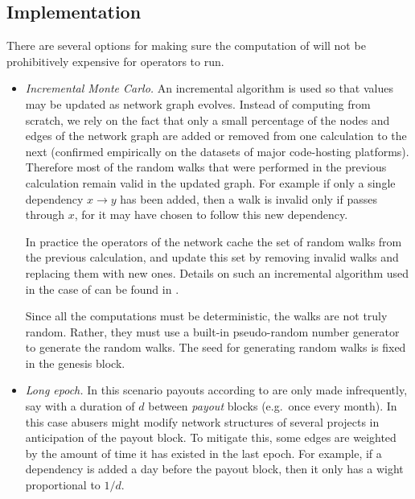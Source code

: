 

\subsection{Implementation}

There are several options for making sure the computation of \osrank{}
will not be prohibitively expensive for operators to run.

\begin{itemize}
\item \emph{Incremental Monte Carlo.} An incremental algorithm is used
  so that \osrank{} values may be updated as network graph
  evolves. Instead of computing \osrank{} from scratch, we rely on the
  fact that only a small percentage of the nodes and edges of the
  network graph are added or removed from one calculation to the next
  (confirmed empirically on the datasets of major code-hosting
  platforms). Therefore most of the random walks that were performed
  in the previous calculation remain valid in the updated graph. For
  example if only a single dependency $x \to y$ has been added, then a
  walk is invalid only if passes through $x$, for it may have chosen
  to follow this new dependency.

  In practice the operators of the network cache the set of random
  walks from the previous calculation, and update this set by removing
  invalid walks and replacing them with new ones. Details on such an
  incremental algorithm used in the case of \pagerank{} can be found
  in \cite{incr_pagerank}.

  Since all the computations must be deterministic, the walks are not
  truly random. Rather, they must use a built-in pseudo-random number
  generator to generate the random walks. The seed for generating
  random walks is fixed in the genesis block.

\item \emph{Long epoch.} In this scenario payouts according to
  \osrank{} are only made infrequently, say with a duration of $d$
  between \emph{payout} blocks (e.g.\ once every month). In this case
  abusers might modify network structures of several projects in
  anticipation of the payout block. To mitigate this, some edges are
  weighted by the amount of time it has existed in the last epoch. For
  example, if a dependency is added a day before the payout block,
  then it only has a wight proportional to $1/d$.
\end{itemize}
  
